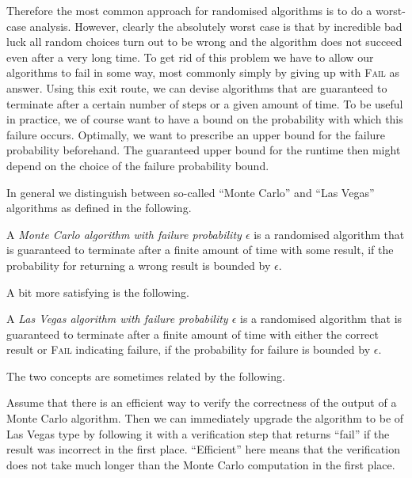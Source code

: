 Therefore the most common approach for randomised algorithms is to do a 
worst-case analysis. However, clearly the absolutely worst case is
that by incredible bad luck all random choices turn out to be wrong
and the algorithm does not succeed even after a very long time. To get
rid of this problem we have to allow our algorithms to fail in some
way, most commonly simply by giving up with \textsc{Fail} as answer.
Using this exit route, we can devise algorithms that are
guaranteed to terminate after a certain number of steps or a given
amount of time. To be useful in practice, we of course want to have a
bound on the probability with which this failure occurs. Optimally, we
want to prescribe an upper bound for the failure probability
beforehand. The guaranteed upper bound for the runtime then might
depend on the choice of the failure probability bound.

In general we distinguish between so-called ``Monte Carlo'' and
``Las Vegas'' algorithms as defined in the following.

\begin{Def}
    A \emph{Monte Carlo algorithm with failure probability $\epsilon$}
    is a randomised algorithm that is guaranteed to terminate after
    a finite amount of time with some result, if the probability for
    returning a wrong result is bounded by $\epsilon$.
\end{Def}

A bit more satisfying is the following.

\begin{Def}
    A \emph{Las Vegas algorithm with failure probability $\epsilon$}
    is a randomised algorithm that is guaranteed to terminate after
    a finite amount of time with either the correct result or
    \textsc{Fail} indicating failure, if the probability for failure
    is bounded by $\epsilon$.
\end{Def}

The two concepts are sometimes related by the following.

\begin{Rem}

Assume that there is an efficient way to verify the correctness of the output
of a Monte Carlo algorithm. Then we can immediately upgrade the
algorithm to be of Las Vegas type by following it with a verification
step that returns ``fail'' if the result was incorrect in the first
place. ``Efficient'' here means that the verification does not take
much longer than the Monte Carlo computation in the first place.
\end{Rem}

